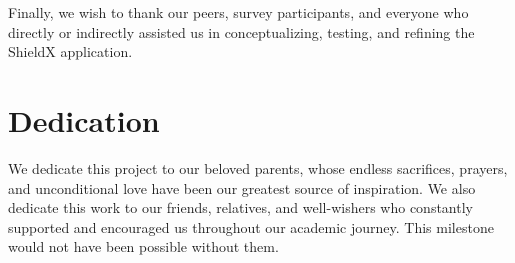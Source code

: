 \documentclass[11pt, a4paper]{report}
\begin{document}
Finally, we wish to thank our peers, survey participants, and everyone who directly or indirectly assisted us in conceptualizing, testing, and refining the ShieldX application.

\chapter*{Dedication}
We dedicate this project to our beloved parents, whose endless sacrifices, prayers, and unconditional love have been our greatest source of inspiration. We also dedicate this work to our friends, relatives, and well-wishers who constantly supported and encouraged us throughout our academic journey. This milestone would not have been possible without them.

\tableofcontents
\clearpage

\listoffigures
{}
\listoftables
{}
\clearpage

\end{document}

